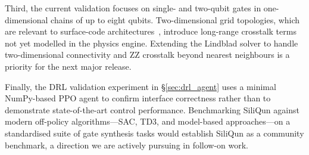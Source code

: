 Third, the current validation focuses on single- and two-qubit gates in one-dimensional chains of up to eight qubits. Two-dimensional grid topologies, which are relevant to surface-code architectures~\cite{Fowler2012}, introduce long-range crosstalk terms not yet modelled in the physics engine. Extending the Lindblad solver to handle two-dimensional connectivity and ZZ crosstalk beyond nearest neighbours is a priority for the next major release.

Finally, the DRL validation experiment in \S\ref{sec:drl_agent} uses a minimal NumPy-based PPO agent to confirm interface correctness rather than to demonstrate state-of-the-art control performance. Benchmarking SiliQun against modern off-policy algorithms—SAC, TD3, and model-based approaches—on a standardised suite of gate synthesis tasks would establish SiliQun as a community benchmark, a direction we are actively pursuing in follow-on work.